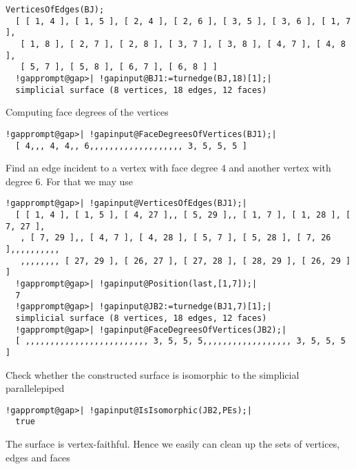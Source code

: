 \documentclass[a4paper,11pt]{report}
\begin{document}
{{{ 
\begin{Verbatim}[commandchars=!@|,fontsize=\small,frame=single,label=Example]
  VerticesOfEdges(BJ);
  [ [ 1, 4 ], [ 1, 5 ], [ 2, 4 ], [ 2, 6 ], [ 3, 5 ], [ 3, 6 ], [ 1, 7 ], 
   [ 1, 8 ], [ 2, 7 ], [ 2, 8 ], [ 3, 7 ], [ 3, 8 ], [ 4, 7 ], [ 4, 8 ], 
   [ 5, 7 ], [ 5, 8 ], [ 6, 7 ], [ 6, 8 ] ]
  !gapprompt@gap>| !gapinput@BJ1:=turnedge(BJ,18)[1];|
  simplicial surface (8 vertices, 18 edges, 12 faces)
\end{Verbatim}
 

 Computing face degrees of the vertices 

 
\begin{Verbatim}[commandchars=!@|,fontsize=\small,frame=single,label=Example]
  !gapprompt@gap>| !gapinput@FaceDegreesOfVertices(BJ1);|
  [ 4,,, 4, 4,, 6,,,,,,,,,,,,,,,,,,, 3, 5, 5, 5 ]
\end{Verbatim}
 

 Find an edge incident to a vertex with face degree 4 and another vertex with
degree 6. For that we may use 

 
\begin{Verbatim}[commandchars=!@|,fontsize=\small,frame=single,label=Example]
  !gapprompt@gap>| !gapinput@VerticesOfEdges(BJ1);|
  [ [ 1, 4 ], [ 1, 5 ], [ 4, 27 ],, [ 5, 29 ],, [ 1, 7 ], [ 1, 28 ], [ 7, 27 ],
   , [ 7, 29 ],, [ 4, 7 ], [ 4, 28 ], [ 5, 7 ], [ 5, 28 ], [ 7, 26 ],,,,,,,,,,
   ,,,,,,,, [ 27, 29 ], [ 26, 27 ], [ 27, 28 ], [ 28, 29 ], [ 26, 29 ] ]
  !gapprompt@gap>| !gapinput@Position(last,[1,7]);|
  7
  !gapprompt@gap>| !gapinput@JB2:=turnedge(BJ1,7)[1];|
  simplicial surface (8 vertices, 18 edges, 12 faces)
  !gapprompt@gap>| !gapinput@FaceDegreesOfVertices(JB2);|
  [ ,,,,,,,,,,,,,,,,,,,,,,,,, 3, 5, 5, 5,,,,,,,,,,,,,,,,,, 3, 5, 5, 5 ]
\end{Verbatim}
 

 Check whether the constructed surface is isomorphic to the simplicial
parallelepiped 

 
\begin{Verbatim}[commandchars=!@|,fontsize=\small,frame=single,label=Example]
  !gapprompt@gap>| !gapinput@IsIsomorphic(JB2,PEs);|
  true
\end{Verbatim}
 

 The surface is vertex-faithful. Hence we easily can clean up the sets of
vertices, edges and faces 

}}}
\end{document}
